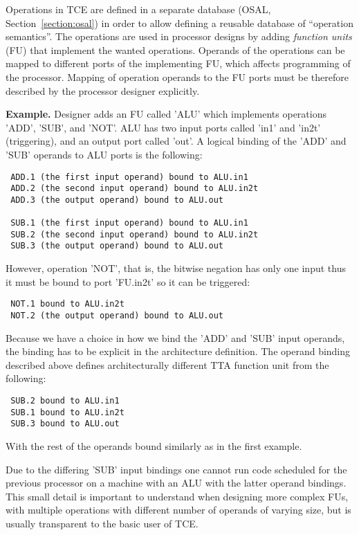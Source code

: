 \documentclass[twoside]{tceusermanual}
\begin{document}
Operations in TCE are defined in a separate database 
(OSAL, Section~\ref{section:osal}) in order to allow defining a reusable
database of ``operation semantics''. The operations are
used in processor designs by adding \textit{function units} (FU) that implement
the wanted operations. Operands of the operations can be
mapped to different ports of the implementing FU, which affects 
programming of the  processor. Mapping of operation operands
to the FU ports must be therefore described by the processor designer
explicitly.

\textbf{Example.} Designer adds an FU called 'ALU' which implements
operations 'ADD', 'SUB', and 'NOT'. ALU has two input ports called 'in1' and 
'in2t' (triggering), and an output port called 'out'. A logical binding of 
the 'ADD' and 'SUB' operands to ALU ports is the following:

\begin{verbatim}
 ADD.1 (the first input operand) bound to ALU.in1
 ADD.2 (the second input operand) bound to ALU.in2t
 ADD.3 (the output operand) bound to ALU.out

 SUB.1 (the first input operand) bound to ALU.in1
 SUB.2 (the second input operand) bound to ALU.in2t
 SUB.3 (the output operand) bound to ALU.out
\end{verbatim}

However, operation 'NOT', that is, the bitwise negation has only one input
thus it must be bound to port 'FU.in2t' so it can be triggered:

\begin{verbatim}
 NOT.1 bound to ALU.in2t
 NOT.2 (the output operand) bound to ALU.out
\end{verbatim}

Because we have a choice in how we bind the 'ADD' and 'SUB' input operands,
the binding has to be explicit in the architecture definition. The operand
binding described above defines architecturally different TTA function unit
from the following:

\begin{verbatim}
 SUB.2 bound to ALU.in1
 SUB.1 bound to ALU.in2t
 SUB.3 bound to ALU.out
\end{verbatim}

With the rest of the operands bound similarly as in the first example.

Due to the differing 'SUB' input bindings one cannot run code scheduled
for the previous processor on a machine with an ALU with the latter 
operand bindings. This small detail is important to understand when 
designing more complex FUs, with multiple operations with different number of 
operands of varying size, but is usually transparent to the basic user of 
TCE.
\end{document}
